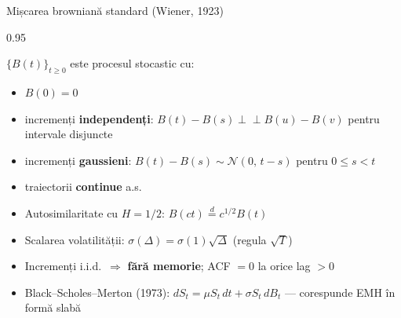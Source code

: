 \documentclass[9pt, aspectratio=169, t]{beamer}
\begin{document}
\begin{frame}[shrink=15]{Mișcarea browniană standard (Wiener, 1923)}
\begin{cminipage}{0.95\textwidth}
\begin{defn}
$\{B(t)\}_{t\geq 0}$ este procesul stocastic cu:
\begin{itemize}\setlength{\itemsep}{0pt}
    \item[(i)] $B(0)=0$
    \item[(ii)] incremenți \textbf{independenți}: $B(t)-B(s)\perp\!\!\!\perp B(u)-B(v)$ pentru intervale disjuncte
    \item[(iii)] incremenți \textbf{gaussieni}: $B(t)-B(s)\sim\mathcal{N}(0,\,t-s)$ pentru $0\leq s<t$
    \item[(iv)] traiectorii \textbf{continue} a.s.
\end{itemize}
\end{defn}
\begin{itemize}\setlength{\itemsep}{0pt}
    \item Autosimilaritate cu $H=1/2$: $B(ct)\stackrel{d}{=}c^{1/2}B(t)$
    \item Scalarea volatilității: $\sigma(\Delta)=\sigma(1)\sqrt{\Delta}$ (regula $\sqrt T$)
    \item Incremenți i.i.d.\ $\Rightarrow$ \textbf{fără memorie}; ACF $=0$ la orice lag $>0$
    \item Black--Scholes--Merton (1973): $dS_t=\mu S_t\,dt+\sigma S_t\,dB_t$ --- corespunde EMH în formă slabă
\end{itemize}
\end{cminipage}
\end{frame}
\end{document}
